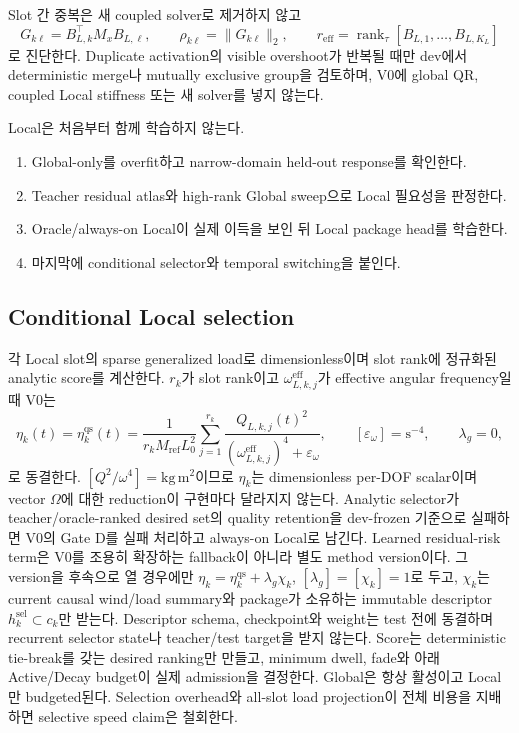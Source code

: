 \documentclass[11pt]{article}
\begin{document}
Slot 간 중복은 새 coupled solver로 제거하지 않고
\[
  G_{k\ell}=B_{L,k}^\top M_xB_{L,\ell},\qquad
  \rho_{k\ell}=\|G_{k\ell}\|_2,\qquad
  r_{\mathrm{eff}}=\operatorname{rank}_{\tau}
  [B_{L,1},\ldots,B_{L,K_L}]
\]
로 진단한다. Duplicate activation의 visible overshoot가 반복될 때만 dev에서 deterministic merge나
mutually exclusive group을 검토하며, V0에 global QR, coupled Local stiffness 또는 새 solver를 넣지 않는다.

Local은 처음부터 함께 학습하지 않는다.
\begin{enumerate}
  \item Global-only를 overfit하고 narrow-domain held-out response를 확인한다.
  \item Teacher residual atlas와 high-rank Global sweep으로 Local 필요성을 판정한다.
  \item Oracle/always-on Local이 실제 이득을 보인 뒤 Local package head를 학습한다.
  \item 마지막에 conditional selector와 temporal switching을 붙인다.
\end{enumerate}

\subsection{Conditional Local selection}

각 Local slot의 sparse generalized load로 dimensionless이며 slot rank에 정규화된 analytic score를 계산한다.
\(r_k\)가 slot rank이고 \(\omega_{L,k,j}^{\mathrm{eff}}\)가 effective angular frequency일 때 V0는
\begin{equation}
  \eta_k(t)=\eta_k^{\mathrm{qs}}(t)
  =\frac{1}{r_kM_{\mathrm{ref}}L_0^2}
  \sum_{j=1}^{r_k}
  \frac{Q_{L,k,j}(t)^2}
  {(\omega_{L,k,j}^{\mathrm{eff}})^4+\varepsilon_\omega},
  \qquad [\varepsilon_\omega]=\mathrm s^{-4},\qquad \lambda_g=0,
  \label{eq:rd-local-score}
\end{equation}
로 동결한다. \([Q^2/\omega^4]=\mathrm{kg\,m^2}\)이므로 \(\eta_k\)는 dimensionless
per-DOF scalar이며 vector \(\Omega\)에 대한 reduction이 구현마다 달라지지 않는다.
Analytic selector가 teacher/oracle-ranked desired set의 quality retention을 dev-frozen 기준으로
실패하면 V0의 Gate D를 실패 처리하고 always-on Local로 남긴다. Learned residual-risk term은
V0를 조용히 확장하는 fallback이 아니라 별도 method version이다. 그 version을 후속으로 열 경우에만
\(\eta_k=\eta_k^{\mathrm{qs}}+\lambda_g\chi_k\), \([\lambda_g]=[\chi_k]=1\)로 두고,
\(\chi_k\)는 current causal wind/load summary와 package가 소유하는 immutable descriptor
\(h_k^{\mathrm{sel}}\subset c_k\)만 받는다. Descriptor schema, checkpoint와 weight는 test 전에
동결하며 recurrent selector state나 teacher/test target을 받지 않는다.
Score는 deterministic tie-break를 갖는 desired ranking만 만들고, minimum dwell, fade와 아래
Active/Decay budget이 실제 admission을 결정한다.
Global은 항상 활성이고 Local만 budgeted된다. Selection overhead와 all-slot load projection이 전체 비용을 지배하면
selective speed claim은 철회한다.
\end{document}
